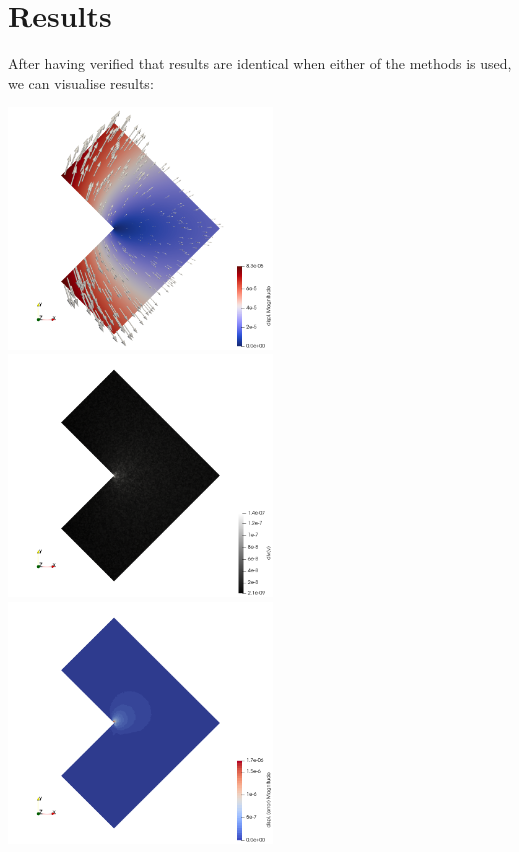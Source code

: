 \newpage
\section*{Results}

After having verified that results are identical when either 
of the methods is used, we can visualise results:

\begin{center}
\includegraphics[width=7cm]{python_codes/fieldstone_179/RESULTS/disp}
\includegraphics[width=7cm]{python_codes/fieldstone_179/RESULTS/divv}\\
\includegraphics[width=7cm]{python_codes/fieldstone_179/RESULTS/error}

\end{center}
